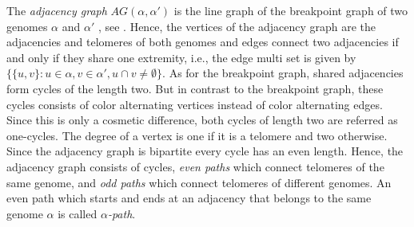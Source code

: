 \documentclass{svmult}
\begin{document}
The \emph{adjacency graph} $AG(\alpha,\alpha')$ is the line graph of the
breakpoint graph of two genomes $\alpha$ and $\alpha'$ \cite{Bergeron_2006},
see .
%
Hence, the vertices of the adjacency graph are the adjacencies and telomeres 
of both genomes and edges connect two adjacencies if and
only if they share one extremity, i.e., the edge multi set is given by $\{\{u,v\} : u\in\alpha, v\in\alpha', u\cap v\neq \emptyset \}$.
As for the breakpoint graph, shared adjacencies form cycles of
the length two. But in contrast to the breakpoint graph, these cycles consists
of color alternating vertices instead of color alternating edges. Since this is
only a cosmetic difference, both cycles of length two are referred as
one-cycles.
%
The degree of a vertex is one if it is a telomere and two otherwise. Since the
adjacency graph is bipartite every cycle has an even length.
%
Hence, the adjacency graph consists of cycles, \emph{even paths}
which connect telomeres of the same genome, and \emph{odd paths}
which connect telomeres of different genomes.
%
%
An even path which starts and ends at an adjacency that belongs to the same
genome $\alpha$ is called \emph{$\alpha$-path}.
%
%
\end{document}
